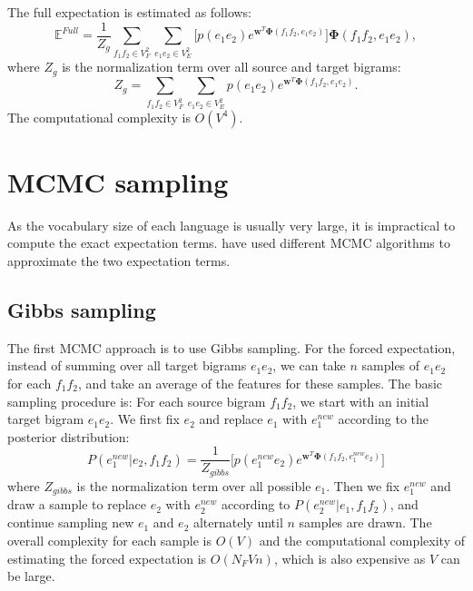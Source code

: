 The full expectation is estimated as follows:
\begin{equation}
\mathbb{E}^{Full} =  \frac{1}{Z_g}   \sum_{f_1 f_2 \in V_F^2} \sum_{e_1 e_2 \in V_E^2}  \biggl [ p(e_1 e_2) e^{\mathbf{w}^T\mathbf{\Phi}(f_1f_2, e_1e_2)} \biggr ] \mathbf{\Phi}(f_1 f_2, e_1 e_2),
\end{equation}
where $Z_g$ is the normalization term over all source and target bigrams: 
\begin{equation}
Z_g = \sum_{f_1 f_2 \in V_F^2} \sum_{e_1e_2 \in V_E^2} p(e_1 e_2)  e^{\mathbf{w}^T\mathbf{\Phi}(f_1f_2, e_1e_2)}.
\end{equation}
The computational complexity is $O(V^4)$.

\section{MCMC sampling}
As the vocabulary size of each language is usually very large, it is impractical to compute the exact expectation terms.
 have used different MCMC algorithms to approximate the two expectation terms.
\subsection{Gibbs sampling}
The first MCMC approach is to use Gibbs sampling. For the forced expectation,
instead of summing over all target bigrams $e_1 e_2$, we can take $n$ samples of $e_1 e_2$ for each $f_1 f_2$, and take an average of the features for these samples. 
The basic sampling procedure is: For each source bigram $f_1f_2$, we start with an initial target bigram $e_1 e_2$. We first fix $e_2$ and replace $e_1$ with $e_1^{new}$ according to the posterior distribution:
\begin{equation}
P(e_1^{new}  | e_2, f_1f_2) = \frac{1}{Z_{gibbs}} \biggl [ p(e_1^{new} e_2)  e^{\mathbf{w}^T\mathbf{\Phi}(f_1f_2, e_1^{new} e_2)} \biggr ]
\end{equation}
where $Z_{gibbs}$ is the normalization term over all possible $e_1$.
Then we fix $e_1^{new}$ and draw a sample to replace $e_2$ with $e_2^{new}$ according to $P(e_2^{new} | e_1, f_1f_2)$, and continue sampling new $e_1$ and $e_2$ alternately until $n$ samples are drawn.
The overall complexity for each sample is $O(V)$ and the computational complexity of estimating the forced expectation is $O(N_F V n)$, which is also expensive as $V$ can be large. 



